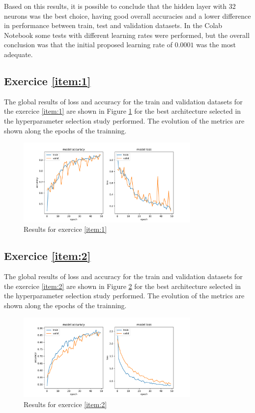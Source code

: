 \documentclass[10pt, a4paper]{article}
\begin{document}
Based on this results, it is possible to conclude that the hidden layer with 32 neurons was the best choice, having good overall accuracies and a lower
difference in performance between train, test and validation datasets. In the Colab Notebook some tests with different learning rates were performed, but
the overall conclusion was that the initial proposed learning rate of $0.0001$ was the most adequate.

\newpage

\subsection{Exercice \ref{item:1}}

The global results of loss and accuracy for the train and validation datasets for the exercice \ref{item:1} are shown in Figure \ref{fig:e1} for the best architecture selected 
in the hyperparameter selection study performed. The evolution of the metrics are shown along the epochs of the trainning.

\begin{figure}[htpb]
  \centering
  \includegraphics[width=0.8\textwidth]{images/1.2.pdf}
  \caption{Results for exercice \ref{item:1}}
  \label{fig:e1}
\end{figure}

\subsection{Exercice \ref{item:2}}

The global results of loss and accuracy for the train and validation datasets for the exercice \ref{item:2} are shown in Figure \ref{fig:e2} for the best architecture selected 
in the hyperparameter selection study performed. The evolution of the metrics are shown along the epochs of the trainning.

\begin{figure}[htpb]
  \centering
  \includegraphics[width=0.8\textwidth]{images/2.pdf}
  \caption{Results for exercice \ref{item:2}}
  \label{fig:e2}
\end{figure}
\end{document}

